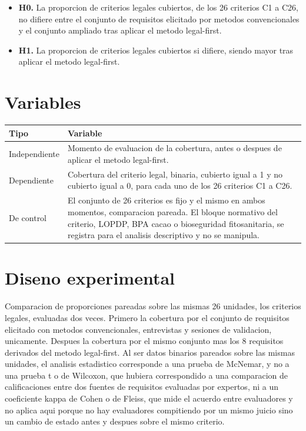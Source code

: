 \documentclass[11pt,a4paper]{article}
\begin{document}
\begin{itemize}
\item \textbf{H0.} La proporcion de criterios legales cubiertos, de los 26 criterios C1 a C26, no difiere entre el conjunto de requisitos elicitado por metodos convencionales y el conjunto ampliado tras aplicar el metodo legal-first.
\item \textbf{H1.} La proporcion de criterios legales cubiertos si difiere, siendo mayor tras aplicar el metodo legal-first.
\end{itemize}

\section{Variables}

\begin{longtable}{L{2.6cm} L{12.4cm}}
\toprule
\textbf{Tipo} & \textbf{Variable} \\
\midrule
\endhead
Independiente & Momento de evaluacion de la cobertura, antes o despues de aplicar el metodo legal-first. \\
\addlinespace
Dependiente & Cobertura del criterio legal, binaria, cubierto igual a 1 y no cubierto igual a 0, para cada uno de los 26 criterios C1 a C26. \\
\addlinespace
De control & El conjunto de 26 criterios es fijo y el mismo en ambos momentos, comparacion pareada. El bloque normativo del criterio, LOPDP, BPA cacao o bioseguridad fitosanitaria, se registra para el analisis descriptivo y no se manipula. \\
\bottomrule
\end{longtable}

\section{Diseno experimental}

Comparacion de proporciones pareadas sobre las mismas 26 unidades, los criterios legales, evaluadas dos veces. Primero la cobertura por el conjunto de requisitos elicitado con metodos convencionales, entrevistas y sesiones de validacion, unicamente. Despues la cobertura por el mismo conjunto mas los 8 requisitos derivados del metodo legal-first. Al ser datos binarios pareados sobre las mismas unidades, el analisis estadistico corresponde a una prueba de McNemar, y no a una prueba t o de Wilcoxon, que hubiera correspondido a una comparacion de calificaciones entre dos fuentes de requisitos evaluadas por expertos, ni a un coeficiente kappa de Cohen o de Fleiss, que mide el acuerdo entre evaluadores y no aplica aqui porque no hay evaluadores compitiendo por un mismo juicio sino un cambio de estado antes y despues sobre el mismo criterio.
\end{document}
